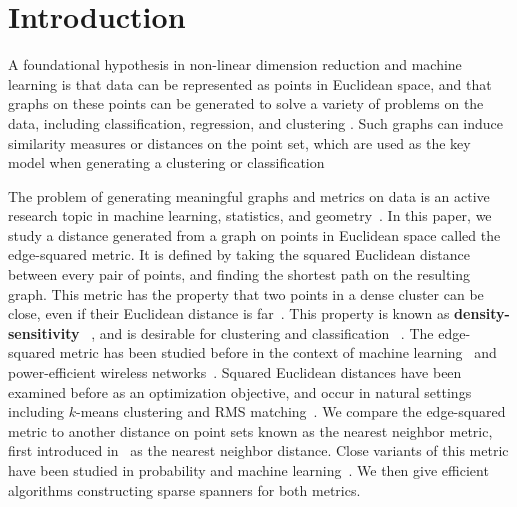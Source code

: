 \section{Introduction}

A foundational hypothesis in non-linear dimension reduction and machine
learning is that data can be represented as points in Euclidean space,
and that graphs on these points can be generated to solve a variety of
problems on the data, including classification, regression, and clustering \cite{Daitch09, Chen11,vL09, Dong11, Hashi15,
vonluxburg13density, mcqueen16megaman}.
Such graphs can induce similarity measures or distances on the point set,
which are used as the key model when generating a clustering or
classification~\cite{Daitch09, bijral11semiSupLearningDBD, tenenbaum00global}

The problem of generating meaningful graphs and metrics on data is an active research topic in machine learning, statistics, and
geometry~\cite{hein07graph, amenta99surface, sajama05estimatingDBDM, vincent03,
bijral11semiSupLearningDBD, Hashi15, alamgir12shortest, ting10analysis,
gorban07principal, bookDey2007, cavanna16adaptive, Gottlieb14, vL04,
agarwal16efficient, SridharMaster, hwang2016}.
%
In this paper, we study a distance generated from a graph
on points in Euclidean space called the edge-squared metric. It
is defined by taking the squared Euclidean distance between every pair of
points, and finding the shortest path on the resulting graph.
This metric has the property that two points
in a dense cluster can be close, even if their Euclidean
distance is far~\cite{bijral11semiSupLearningDBD}.
This property is known as \textbf{density-sensitivity}
~\cite{vincent03}, and is
desirable for clustering and classification
~\cite{sajama05estimatingDBDM, alamgir12shortest, hwang2016,
cohen15approximating}. The edge-squared metric has been studied
before in the
context of machine learning~\cite{bijral11semiSupLearningDBD, vincent03, hwang2016, alamgir12shortest,
cohen15approximating} and
power-efficient wireless
networks~\cite{LiWan2001, LiWan2002}.
Squared Euclidean distances have been
examined before as an optimization objective, and occur in
natural settings including $k$-means clustering and RMS
matching~\cite{macqueen67,Agarwal12}.
We compare the edge-squared metric to another
distance on point sets known as the nearest neighbor metric,
first introduced in~\cite{cohen15approximating} as the nearest neighbor
distance. Close variants of this metric have been studied in
probability and machine learning~\cite{sajama05estimatingDBDM, cohen15approximating,
hwang2016}. We then give efficient algorithms constructing sparse
spanners for both metrics.

